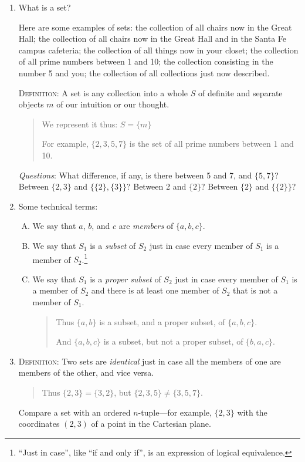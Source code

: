 \documentclass[twoside,openright]{article}
\begin{document}
\begin{enumerate}
\item What is a set? \label{set}

  Here are some examples of sets: the collection of all chairs now in
  the Great Hall; the collection of all chairs now in the Great Hall
  and in the Santa Fe campus cafeteria; the collection of all things
  now in your closet; the collection of all prime numbers between 1
  and 10; the collection consisting in the number 5 and you; the
  collection of all collections just now described.

  \textsc{Definition}\label{DefSet}: A set is any collection into a
  whole $S$ of definite and separate objects $m$ of our intuition or
  our thought.
\begin{quote}
{\small We represent it thus: $S=\{m\}$

  For example, $\{2,3,5,7\}$ is the set of all prime numbers between 1
  and 10.}
\end{quote}
\emph{Questions}: What difference, if any, is there between 5 and 7,
and $\{5,7\}$? Between $\{2,3\}$ and $\{\{2\},\{3\}\}$? Between 2 and
$\{2\}$? Between $\{2\}$ and $\{\{2\}\}$?
\item Some technical terms:
  \begin{enumerate}[A.]
  \item We say that $a$, $b$, and $c$ are \emph{members} of
    $\{a,b,c\}$.
  \item We say that $S_1$ is a \emph{subset} of $S_2$ just in case
    every member of $S_1$ is a member of
    $S_2$.\protect\footnote{``Just in case'', like ``if and only if'',
      is an expression of logical equivalence.}
  \item We say that $S_1$ is a \emph{proper subset} of $S_2$ just in
    case every member of $S_1$ is a member of $S_2$ and there is at
    least one member of $S_2$ that is not a member of $S_1$.
\begin{quote}
{\small Thus $\{a,b\}$ is a subset, and a proper subset, of $\{a,b,c\}$.

  And $\{a,b,c\}$ is a subset, but not a proper subset, of
  $\{b,a,c\}$.}
\end{quote}
\end{enumerate}
\item \textsc{Definition}: Two sets are \emph{identical} just in case
  all the members of one are members of the other, and vice versa.
  \begin{quote} {\small Thus $\{2,3\}=\{3,2\}$, but
      $\{2,3,5\}\neq\{3,5,7\}$.}
  \end{quote}
  Compare a set with an ordered $n$-tuple---for example, $\{2,3\}$
  with the coordinates $(2,3)$ of a point in the Cartesian plane.


\end{enumerate}
\end{document}
